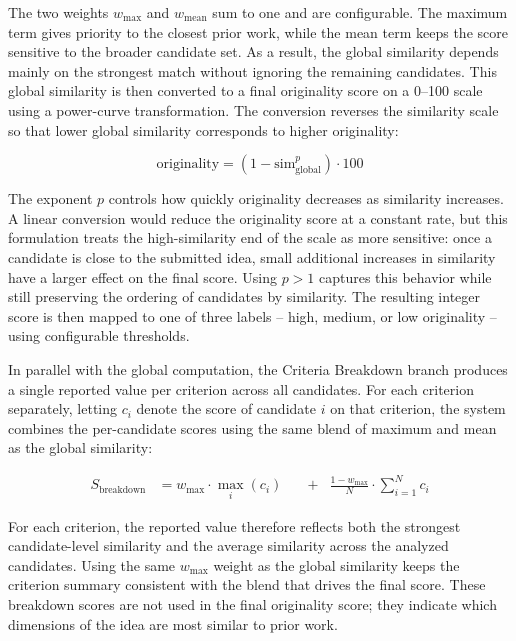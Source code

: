 The two weights $w_{\max}$ and $w_{\text{mean}}$ sum to one and are configurable. The maximum term gives priority to the closest prior work, while the mean term keeps the score sensitive to the broader candidate set. As a result, the global similarity depends mainly on the strongest match without ignoring the remaining candidates. This global similarity is then converted to a final originality score on a 0--100 scale using a power-curve transformation. The conversion reverses the similarity scale so that lower global similarity corresponds to higher originality:

\begin{equation}
	\text{originality} = \left(1 - \text{sim}_{\text{global}}^{p}\right) \cdot 100
	\label{eq:originality}
\end{equation}

The exponent $p$ controls how quickly originality decreases as similarity increases. A linear conversion would reduce the originality score at a constant rate, but this formulation treats the high-similarity end of the scale as more sensitive: once a candidate is close to the submitted idea, small additional increases in similarity have a larger effect on the final score. Using $p > 1$ captures this behavior while still preserving the ordering of candidates by similarity. The resulting integer score is then mapped to one of three labels -- high, medium, or low originality -- using configurable thresholds.

In parallel with the global computation, the Criteria Breakdown branch produces a single reported value per criterion across all candidates. For each criterion separately, letting $c_i$ denote the score of candidate $i$ on that criterion, the system combines the per-candidate scores using the same blend of maximum and mean as the global similarity:

\begin{equation}
\begin{alignedat}{2}
	S_{\text{breakdown}}
	&= w_{\max} \cdot \max_{i}(c_i)
	&\quad{}+{}& \frac{1 - w_{\max}}{N} \cdot \sum_{i=1}^{N} c_i
\end{alignedat}
\label{eq:breakdown}
\end{equation}

For each criterion, the reported value therefore reflects both the strongest candidate-level similarity and the average similarity across the analyzed candidates. Using the same $w_{\max}$ weight as the global similarity keeps the criterion summary consistent with the blend that drives the final score. These breakdown scores are not used in the final originality score; they indicate which dimensions of the idea are most similar to prior work.

